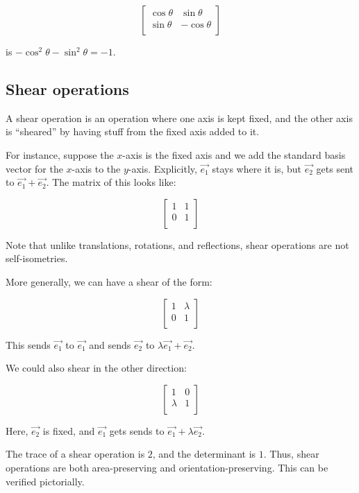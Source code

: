 \documentclass[10pt]{amsart}
\begin{document}
$$\left[\begin{matrix} \cos \theta & \sin \theta \\ \sin \theta & - \cos \theta \\\end{matrix}\right]$$

is $-\cos^2\theta - \sin^2\theta = -1$.
\subsection{Shear operations}

A shear operation is an operation where one axis is kept fixed, and
the other axis is ``sheared'' by having stuff from the fixed axis
added to it. 

For instance, suppose the $x$-axis is the fixed axis and
we add the standard basis vector for the $x$-axis to the
$y$-axis. Explicitly, $\vec{e_1}$ stays where it is, but $\vec{e_2}$
gets sent to $\vec{e_1} + \vec{e_2}$. The matrix of this looks like:

$$\left[\begin{matrix} 1 & 1 \\ 0 & 1 \\\end{matrix}\right]$$

Note that unlike translations, rotations, and reflections, shear
operations are not self-isometries.

More generally, we can have a shear of the form:

$$\left[\begin{matrix} 1 & \lambda \\ 0 & 1 \\\end{matrix}\right]$$

This sends $\vec{e_1}$ to $\vec{e_1}$ and sends $\vec{e_2}$ to
$\lambda\vec{e_1} + \vec{e_2}$.

We could also shear in the other direction:

$$\left[\begin{matrix} 1 & 0 \\ \lambda & 1 \\\end{matrix}\right]$$

Here, $\vec{e_2}$ is fixed, and $\vec{e_1}$ gets sends to $\vec{e_1} +
\lambda\vec{e_2}$.

The trace of a shear operation is $2$, and the determinant is
$1$. Thus, shear operations are both area-preserving and
orientation-preserving. This can be verified pictorially.
\end{document}
